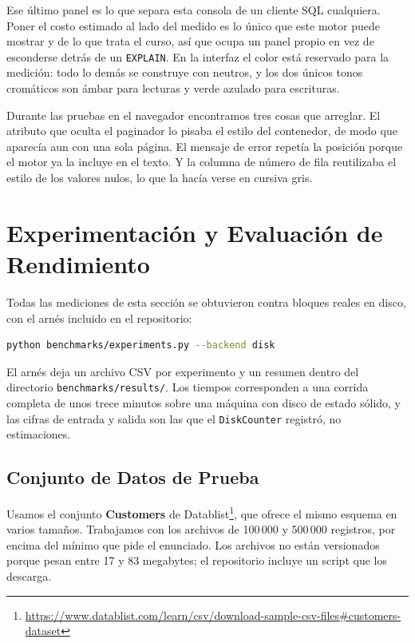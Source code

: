 \documentclass[a4paper,12pt]{article}
\begin{document}
Ese último panel es lo que separa esta consola de un cliente SQL cualquiera.
Poner el costo estimado al lado del medido es lo único que este motor puede
mostrar y de lo que trata el curso, así que ocupa un panel propio en vez de
esconderse detrás de un \texttt{EXPLAIN}. En la interfaz el color está reservado
para la medición: todo lo demás se construye con neutros, y los dos únicos tonos
cromáticos son ámbar para lecturas y verde azulado para escrituras.

Durante las pruebas en el navegador encontramos tres cosas que arreglar. El
atributo que oculta el paginador lo pisaba el estilo del contenedor, de modo que
aparecía aun con una sola página. El mensaje de error repetía la posición porque
el motor ya la incluye en el texto. Y la columna de número de fila reutilizaba
el estilo de los valores nulos, lo que la hacía verse en cursiva gris.

\section{Experimentación y Evaluación de Rendimiento}

Todas las mediciones de esta sección se obtuvieron contra bloques reales en
disco, con el arnés incluido en el repositorio:

\begin{lstlisting}[language=bash, caption={Ejecución de los cuatro experimentos}]
python benchmarks/experiments.py --backend disk
\end{lstlisting}

El arnés deja un archivo CSV por experimento y un resumen dentro del
directorio \texttt{benchmarks/\allowbreak results/}. Los tiempos corresponden a una corrida completa de
unos trece minutos sobre una máquina con disco de estado sólido, y las cifras de
entrada y salida son las que el \texttt{DiskCounter} registró, no estimaciones.

\subsection{Conjunto de Datos de Prueba}

Usamos el conjunto \textbf{Customers} de
Datablist\footnote{\url{https://www.datablist.com/learn/csv/download-sample-csv-files\#customers-dataset}},
que ofrece el mismo esquema en varios tamaños. Trabajamos con los archivos de
100\,000 y 500\,000 registros, por encima del mínimo que pide el enunciado. Los
archivos no están versionados porque pesan entre 17 y 83 megabytes; el
repositorio incluye un script que los descarga.
\end{document}
